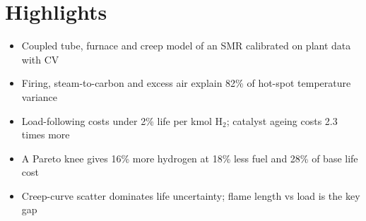\documentclass[12pt]{article}
\begin{document}
\section*{Highlights}
\begin{itemize}
\item Coupled tube, furnace and creep model of an SMR calibrated on plant data with CV
\item Firing, steam-to-carbon and excess air explain 82\% of hot-spot temperature variance
\item Load-following costs under 2\% life per kmol H$_2$; catalyst ageing costs 2.3 times more
\item A Pareto knee gives 16\% more hydrogen at 18\% less fuel and 28\% of base life cost
\item Creep-curve scatter dominates life uncertainty; flame length vs load is the key gap
\end{itemize}
\end{document}
